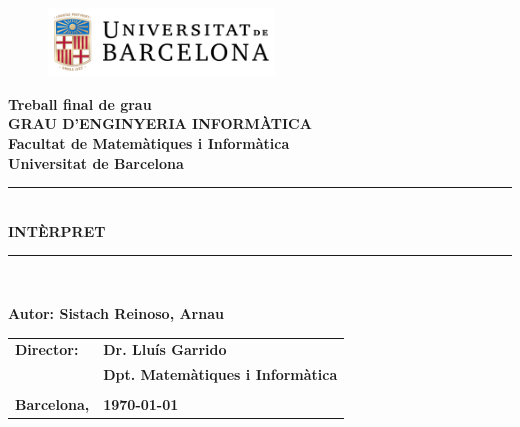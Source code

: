 \begin{titlepage}
\begin{center}
    \begin{figure}[htb]
        \centering
        \includegraphics[width=6cm]{ub_color.pdf}
    \end{figure}
    \textbf{\LARGE Treball final de grau}\\
    \vspace*{.5cm}
    \textbf{\LARGE GRAU D'ENGINYERIA INFORMÀTICA }\\
    \vspace*{.5cm}
    \textbf{\LARGE Facultat de Matemàtiques i Informàtica\\ Universitat de Barcelona}\\
    \vspace*{1.5cm}

    \rule{\textwidth}{.1mm}\\[3mm]
    \textbf{\Huge INTÈRPRET}\\
    \rule{\textwidth}{.1mm}\\[1cm]
\end{center}

\begin{flushright}
    \textbf{\LARGE Autor: Sistach Reinoso, Arnau}\\[2cm]

    \begin{tabular}{ll}
        \textbf{\Large Director:} & \textbf{\Large Dr. Lluís Garrido } \\
        & \textbf{\Large Dpt. Matemàtiques i Informàtica}\\
        \\
        \textbf{\Large Barcelona,} & \textbf{\Large \today }
    \end{tabular}
\end{flushright}

\end{titlepage}
